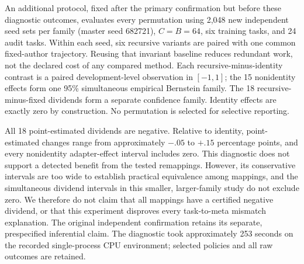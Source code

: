 An additional protocol, fixed after the primary confirmation but before these diagnostic outcomes, evaluates every permutation using 2,048 new independent seed sets per family (master seed 682721), $C=B=64$, six training tasks, and 24 audit tasks. Within each seed, six recursive variants are paired with one common fixed-author trajectory. Reusing that invariant baseline reduces redundant work, not the declared cost of any compared method. Each recursive-minus-identity contrast is a paired development-level observation in $[-1,1]$; the 15 nonidentity effects form one 95\% simultaneous empirical Bernstein family. The 18 recursive-minus-fixed dividends form a separate confidence family. Identity effects are exactly zero by construction. No permutation is selected for selective reporting.

\begin{table}[h]
\centering
\caption{All mapping diagnostics, in percentage points. A mapping 120 sends original tag 0 to 1, 1 to 2, and 2 to 0. Dividend and adapter-change intervals belong to separate simultaneous confidence families.}
{\small}
\end{table}

All 18 point-estimated dividends are negative. Relative to identity, point-estimated changes range from approximately $-.05$ to $+.15$ percentage points, and every nonidentity adapter-effect interval includes zero. This diagnostic does not support a detected benefit from the tested remappings. However, its conservative intervals are too wide to establish practical equivalence among mappings, and the simultaneous dividend intervals in this smaller, larger-family study do not exclude zero. We therefore do not claim that all mappings have a certified negative dividend, or that this experiment disproves every task-to-meta mismatch explanation. The original independent confirmation retains its separate, prespecified inferential claim. The diagnostic took approximately 253 seconds on the recorded single-process CPU environment; selected policies and all raw outcomes are retained.

